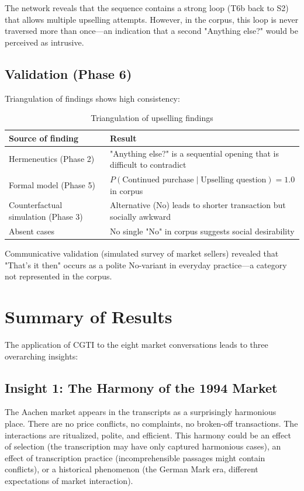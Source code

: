 \documentclass[12pt,a4paper]{article}
\begin{document}
The network reveals that the sequence contains a strong loop (T6b back to S2) that allows multiple upselling attempts. However, in the corpus, this loop is never traversed more than once—an indication that a second "Anything else?" would be perceived as intrusive.

\subsection{Validation (Phase 6)}

Triangulation of findings shows high consistency:

\begin{table}[H]
\centering
\caption{Triangulation of upselling findings}
\begin{tabular}{@{}ll@{}}
\toprule
Source of finding & Result \\
\midrule
Hermeneutics (Phase 2) & "Anything else?" is a sequential opening that is difficult to contradict \\
Formal model (Phase 5) & $P(\text{Continued purchase} \mid \text{Upselling question}) = 1.0$ in corpus \\
Counterfactual simulation (Phase 3) & Alternative (No) leads to shorter transaction but socially awkward \\
Absent cases & No single "No" in corpus suggests social desirability \\
\bottomrule
\end{tabular}
\end{table}

Communicative validation (simulated survey of market sellers) revealed that "That's it then" occurs as a polite No-variant in everyday practice—a category not represented in the corpus.

\section{Summary of Results}

The application of CGTI to the eight market conversations leads to three overarching insights:

\subsection{Insight 1: The Harmony of the 1994 Market}

The Aachen market appears in the transcripts as a surprisingly harmonious place. There are no price conflicts, no complaints, no broken-off transactions. The interactions are ritualized, polite, and efficient. This harmony could be an effect of selection (the transcription may have only captured harmonious cases), an effect of transcription practice (incomprehensible passages might contain conflicts), or a historical phenomenon (the German Mark era, different expectations of market interaction).
\end{document}
